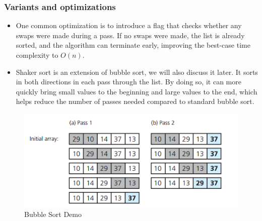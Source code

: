 \subsubsection{Variants and optimizations}
\begin{itemize}[label=-]
    \item One common optimization is to introduce a flag that checks whether any swaps were made during a pass. If no swaps were made, the list is already sorted, and the algorithm can terminate early, improving the best-case time complexity to $O(n)$.
    \item Shaker sort is an extension of bubble sort, we will also discuss it later. It sorts in both directions in each pass through the list. By doing so, it can more quickly bring small values to the beginning and large values to the end, which helps reduce the number of passes needed compared to standard bubble sort.
\end{itemize}

\begin{figure}[h]
    \centering
    \includegraphics[scale=.80]{Figures/sort_demo/bubble.png}
    \caption{Bubble Sort Demo}
    \label{fig:enter-label}
\end{figure}

\vspace{10pt}
